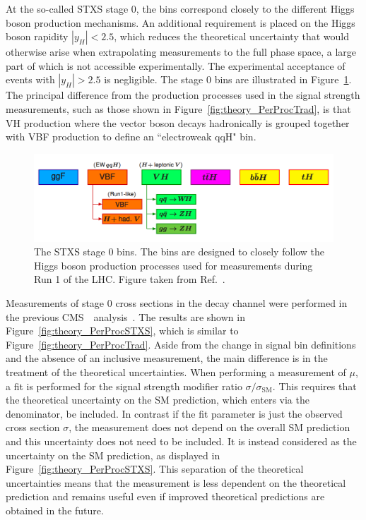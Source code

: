 At the so-called STXS stage 0, 
the bins correspond closely to the different Higgs boson production mechanisms.
An additional requirement is placed on the Higgs boson rapidity $|y_H| < 2.5$, 
which reduces the theoretical uncertainty 
that would otherwise arise when extrapolating measurements to the full phase space,
a large part of which is not accessible experimentally.
The experimental acceptance of \Hgg events with $|y_H| > 2.5$ is negligible.
The stage 0 bins are illustrated in Figure~\ref{fig:theory_stage0}.
The principal difference from the production processes used in the signal strength measurements,
such as those shown in Figure~\ref{fig:theory_PerProcTrad},
is that VH production where the vector boson decays hadronically is grouped together with 
VBF production to define an ``electroweak qqH" bin.

\begin{figure}[hptb]
  \centering
  \includegraphics[width=\textwidth]{Figures/Theory/stage0.png}
  \caption[Stage 0 STXS bins.]
  {
    The STXS stage 0 bins. 
    The bins are designed to closely follow the Higgs boson production processes
    used for measurements during Run 1 of the LHC.
    Figure taken from Ref.~\cite{YR4}.
  }
  \label{fig:theory_stage0}
\end{figure}

Measurements of stage 0 cross sections in the \Hgg decay channel 
were performed in the previous CMS~\Hgg~analysis~\cite{HIG-16-040}.
The results are shown in Figure~\ref{fig:theory_PerProcSTXS}, 
which is similar to Figure~\ref{fig:theory_PerProcTrad}.
Aside from the change in signal bin definitions and the absence of an inclusive measurement, 
the main difference is in the treatment of the theoretical uncertainties.
When performing a measurement of $\mu$, 
a fit is performed for the signal strength modifier ratio $\sigma/\sigma_{\textrm{SM}}$. 
This requires that the theoretical uncertainty on the SM prediction, 
which enters via the denominator, be included.
In contrast if the fit parameter is just the observed cross section $\sigma$, 
the measurement does not depend on the overall SM prediction 
and this uncertainty does not need to be included.
It is instead considered as the uncertainty on the SM prediction, 
as displayed in Figure~\ref{fig:theory_PerProcSTXS}.
This separation of the theoretical uncertainties means that the measurement is less dependent 
on the theoretical prediction and remains useful 
even if improved theoretical predictions are obtained in the future.

